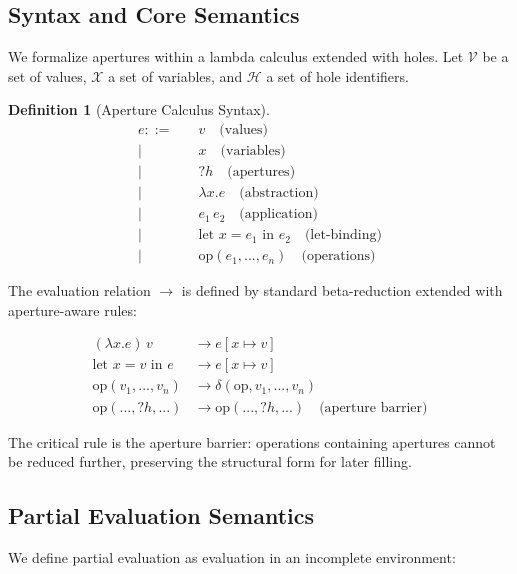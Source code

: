 \documentclass[12pt]{article}
\newtheorem{definition}[theorem]{Definition}
\begin{document}
\subsection{Syntax and Core Semantics}

We formalize apertures within a lambda calculus extended with holes. Let $\mathcal{V}$ be a set of values, $\mathcal{X}$ a set of variables, and $\mathcal{H}$ a set of hole identifiers.

\begin{definition}[Aperture Calculus Syntax]
\begin{align}
e ::= \quad & v \quad \text{(values)} \\
    | \quad & x \quad \text{(variables)} \\
    | \quad & ?h \quad \text{(apertures)} \\
    | \quad & \lambda x.e \quad \text{(abstraction)} \\
    | \quad & e_1 \, e_2 \quad \text{(application)} \\
    | \quad & \text{let } x = e_1 \text{ in } e_2 \quad \text{(let-binding)} \\
    | \quad & \text{op}(e_1, ..., e_n) \quad \text{(operations)}
\end{align}
\end{definition}

The evaluation relation $\rightarrow$ is defined by standard beta-reduction extended with aperture-aware rules:

\begin{align}
(\lambda x.e) \, v &\rightarrow e[x \mapsto v] \\
\text{let } x = v \text{ in } e &\rightarrow e[x \mapsto v] \\
\text{op}(v_1, ..., v_n) &\rightarrow \delta(\text{op}, v_1, ..., v_n) \\
\text{op}(..., ?h, ...) &\rightarrow \text{op}(..., ?h, ...) \quad \text{(aperture barrier)}
\end{align}

The critical rule is the aperture barrier: operations containing apertures cannot be reduced further, preserving the structural form for later filling.

\subsection{Partial Evaluation Semantics}

We define partial evaluation as evaluation in an incomplete environment:
\end{document}
